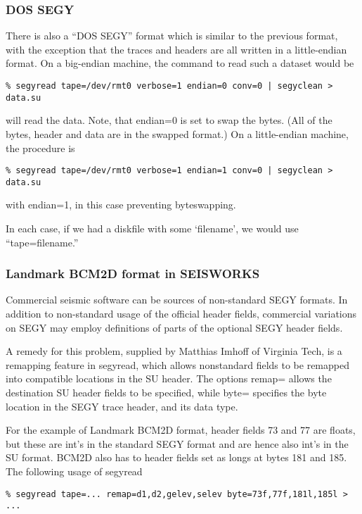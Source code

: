 {{{\subsubsection{DOS SEGY}
There is also a ``DOS SEGY'' format which is similar to the previous
format, with the exception that the traces and headers are all written
in a little-endian format. On a big-endian machine,
the command to read such a dataset would be
{\small\begin{verbatim}
% segyread tape=/dev/rmt0 verbose=1 endian=0 conv=0 | segyclean > data.su
\end{verbatim}}\noindent
will read the data. Note, that endian=0 is set to swap the bytes.
(All of the bytes, header and data are in the swapped format.)
On a little-endian machine, the procedure is 
{\small\begin{verbatim}
% segyread tape=/dev/rmt0 verbose=1 endian=1 conv=0 | segyclean > data.su
\end{verbatim}}\noindent
with endian=1, in this case preventing byteswapping.

In each case, if we had a diskfile with some `filename', we would
use ``tape=filename.''

\subsubsection{Landmark BCM2D format in SEISWORKS}

Commercial seismic software can be sources of non-standard SEGY formats.
In addition to non-standard usage of the official header fields, 
commercial variations on SEGY may employ definitions of parts of the 
optional SEGY header fields.

A remedy for this problem, supplied by Matthias Imhoff of Virginia Tech,
is a remapping feature in segyread, which allows nonstandard fields
to be remapped into compatible locations in the SU header.  The
options remap=  allows the destination SU header fields to be specified,
while byte= specifies the byte location in the SEGY trace header, and
its data type.

For the example of Landmark BCM2D format, header fields 73 and 77 are
floats, but these are int's in the standard SEGY format and are hence
also int's in the SU format. BCM2D also has to header fields set as longs
at bytes 181 and 185. The following usage of segyread 

{\small\begin{verbatim}
% segyread tape=... remap=d1,d2,gelev,selev byte=73f,77f,181l,185l > ...
\end{verbatim}}\noindent

}}}

